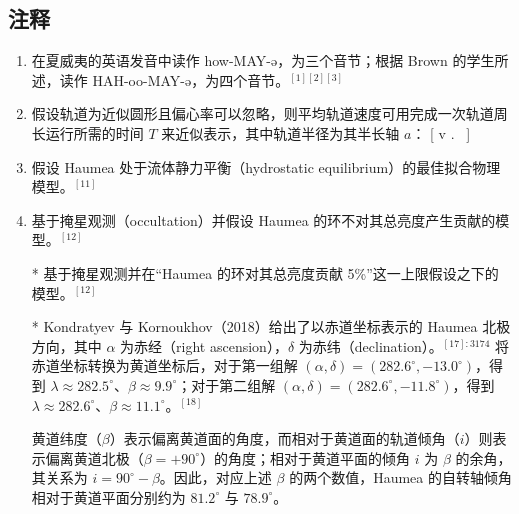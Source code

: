 \subsection{注释}
\begin{enumerate}
\item 在夏威夷的英语发音中读作 how-MAY-ə，为三个音节；根据 Brown 的学生所述，读作 HAH-oo-MAY-ə，为四个音节。$^{[1][2][3]}$
\item 假设轨道为近似圆形且偏心率可以忽略，则平均轨道速度可用完成一次轨道周长运行所需的时间 $T$ 来近似表示，其中轨道半径为其半长轴 $a$：
  [
  v \approx {}.~
  ]

\item 假设 Haumea 处于流体静力平衡（hydrostatic equilibrium）的最佳拟合物理模型。$^{[11]}$

\item  基于掩星观测（occultation）并假设 Haumea 的环不对其总亮度产生贡献的模型。$^{[12]}$

* 基于掩星观测并在“Haumea 的环对其总亮度贡献 5\%”这一上限假设之下的模型。$^{[12]}$

* Kondratyev 与 Kornoukhov（2018）给出了以赤道坐标表示的 Haumea 北极方向，其中 $\alpha$ 为赤经（right ascension），$\delta$ 为赤纬（declination）。$^{[17]:3174}$
  将赤道坐标转换为黄道坐标后，对于第一组解 $(\alpha, \delta) = (282.6^\circ, -13.0^\circ)$，得到 $\lambda \approx 282.5^\circ$、$\beta \approx 9.9^\circ$；对于第二组解 $(\alpha, \delta) = (282.6^\circ, -11.8^\circ)$，得到 $\lambda \approx 282.6^\circ$、$\beta \approx 11.1^\circ$。$^{[18]}$

  黄道纬度（$\beta$）表示偏离黄道面的角度，而相对于黄道面的轨道倾角（$i$）则表示偏离黄道北极（$\beta = +90^\circ$）的角度；相对于黄道平面的倾角 $i$ 为 $\beta$ 的余角，其关系为 $i = 90^\circ - \beta$。因此，对应上述 $\beta$ 的两个数值，Haumea 的自转轴倾角相对于黄道平面分别约为 $81.2^\circ$ 与 $78.9^\circ$。
\end{enumerate}

